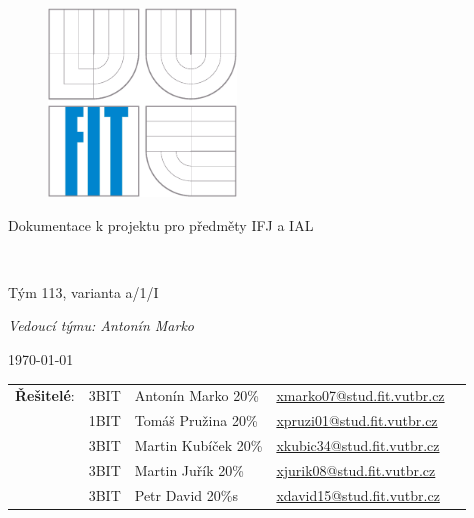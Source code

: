 \begin{titlepage}

\begin{figure}[!h]
  \centering
  \includegraphics[height=5cm]{img/logo.eps}
\end{figure}

\vfill

\begin{center}
\begin{Large}
Dokumentace k projektu pro předměty IFJ a IAL\\
\end{Large}
\bigskip
\begin{Huge}
\projname\\
\end{Huge}
\begin{large}
Tým 113, varianta a/1/I\\
\end{large}
\textit{Vedoucí týmu: Antonín Marko}\\
\end{center}

\vfill

\begin{center}
\begin{Large}
\today
\end{Large}
\end{center}

\vfill

\begin{flushleft}
\begin{tabular}{l l l l l}
\textbf{Řešitelé}: 
&3BIT& Antonín Marko 20\% &\url{xmarko07@stud.fit.vutbr.cz} \\
&1BIT& Tomáš Pružina 20\% &\url{xpruzi01@stud.fit.vutbr.cz} \\
&3BIT& Martin Kubíček 20\% &\url{xkubic34@stud.fit.vutbr.cz} \\
&3BIT& Martin Juřík 20\% &\url{xjurik08@stud.fit.vutbr.cz} \\
&3BIT& Petr David 20\%s &\url{xdavid15@stud.fit.vutbr.cz} \\


\end{tabular}
\end{flushleft}
\end{titlepage}
